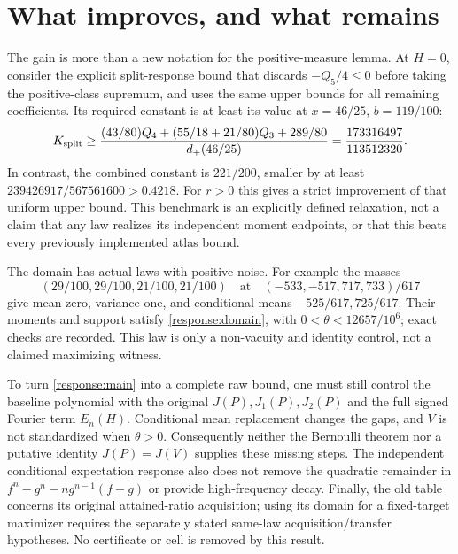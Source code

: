 \section{What improves, and what remains}
The gain is more than a new notation for the positive-measure lemma.
At $H=0$, consider the explicit split-response bound that discards
$-Q_5/4\le0$ before taking the positive-class supremum, and uses the same
upper bounds for all remaining coefficients. Its required constant is
at least its value at $x=46/25$, $b=119/100$:
\[
 K_{\rm split}\ge
 \frac{(43/80)Q_4+(55/18+21/80)Q_3+289/80}{d_+(46/25)}
 =\frac{173316497}{113512320}.
\]
In contrast, the combined constant is $221/200$, smaller by at least
$239426917/567561600>0.4218$. For $r>0$ this gives a strict improvement
of that uniform upper bound. This benchmark is an explicitly defined
relaxation, not a claim that any law realizes its independent moment
endpoints, or that this beats every previously implemented atlas bound.

The domain has actual laws with positive noise. For example the masses
\[
 (29/100,29/100,21/100,21/100)\quad\text{at}\quad
 (-533,-517,717,733)/617
\]
give mean zero, variance one, and conditional means $-525/617,725/617$.
Their moments and support satisfy \eqref{response:domain}, with
$0<\theta<12657/10^6$; exact checks are recorded. This law is only a
non-vacuity and identity control, not a claimed maximizing witness.

To turn \eqref{response:main} into a complete raw bound, one must still
control the baseline polynomial with the original $J(P),J_1(P),J_2(P)$
and the full signed Fourier term $E_n(H)$. Conditional mean replacement
changes the gaps, and $V$ is not standardized when $\theta>0$.
Consequently neither the Bernoulli theorem nor a putative identity
$J(P)=J(V)$ supplies these missing steps. The independent conditional
expectation response also does not remove the quadratic remainder in
$f^n-g^n-ng^{n-1}(f-g)$ or provide high-frequency decay.
Finally, the old table concerns its original attained-ratio acquisition;
using its domain for a fixed-target maximizer requires the separately
stated same-law acquisition/transfer hypotheses. No certificate or cell
is removed by this result.
